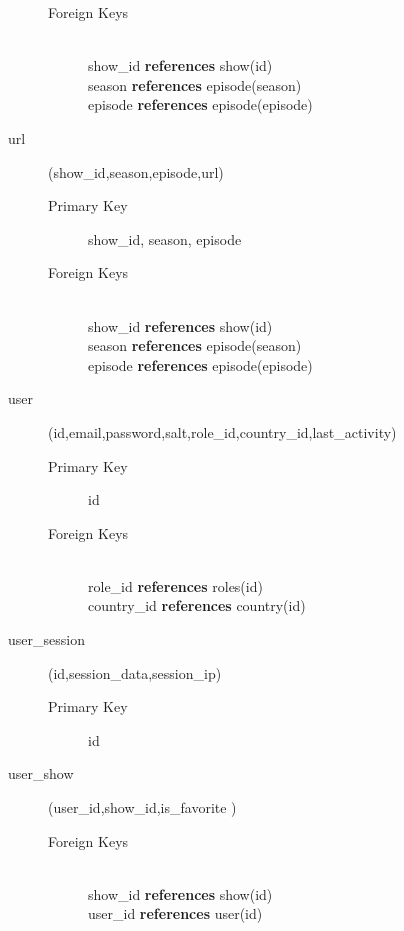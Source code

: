\begin{description}
\begin{description}
			\item[Foreign Keys] \hfill \\ show\_id \textbf{references} show(id) \hfill \\ season \textbf{references} episode(season) \hfill \\ episode \textbf{references} episode(episode)
		\end{description}
	\item[url] (show\_id,season,episode,url)
		\begin{description}
			\item[Primary Key] show\_id, season, episode
			\item[Foreign Keys] \hfill \\ show\_id \textbf{references} show(id) \hfill \\ season \textbf{references} episode(season) \hfill \\ episode \textbf{references} episode(episode)
		\end{description}
	\item[user] (id,email,password,salt,role\_id,country\_id,last\_activity)
		\begin{description}
			\item[Primary Key] id
			\item[Foreign Keys] \hfill \\ role\_id \textbf{references} roles(id) \hfill \\ country\_id \textbf{references} country(id)
		\end{description}
	\item[user\_session] (id,session\_data,session\_ip)
		\begin{description}
			\item[Primary Key] id
		\end{description}
	\item[user\_show] (user\_id,show\_id,is\_favorite  )
		\begin{description}
			\item[Foreign Keys] \hfill \\ show\_id \textbf{references} show(id) \hfill \\ user\_id \textbf{references} user(id)
		\end{description}
	
\end{description}